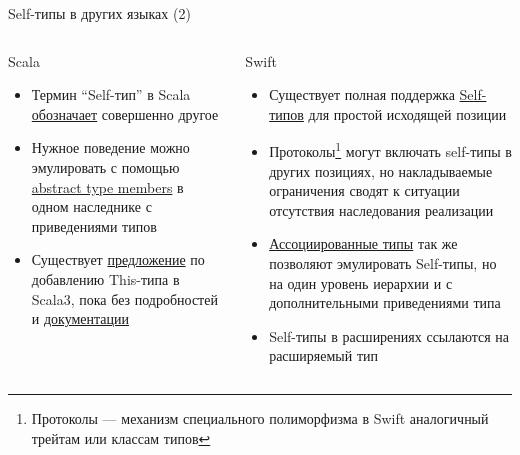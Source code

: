 \documentclass[handout,aspectratio=169,usenames,dvipsnames]{beamer}
\begin{document}
\begin{frame}[fragile]{Self-типы в других языках (2)}
    \begin{columns}[onlytextwidth]
        \begin{column}{0.44\textwidth}
            \begin{block}{Scala}
                \begin{itemize}
                    \item Термин ``Self-тип'' в Scala \href{https://docs.scala-lang.org/tour/self-types.html}{\color{blue} обозначает} совершенно другое
                    \item Нужное поведение можно эмулировать с помощью \href{https://docs.scala-lang.org/tour/abstract-type-members.html}{\color{blue}abstract type members} в одном наследнике с приведениями типов
                    \item Существует \href{https://github.com/lampepfl/dotty/issues/7374}{\color{blue}предложение} по добавлению This-типа в Scala3, пока без подробностей и \href{http://dotty.epfl.ch/}{\color{blue}документации}
                \end{itemize}
            \end{block}
        \end{column}\hfill%
        \pause
        \begin{column}{0.53\textwidth}
            \begin{block}{Swift}
                \begin{itemize}
                    \item Существует полная поддержка \href{https://docs.swift.org/swift-book/documentation/the-swift-programming-language/types/\#Self-Type}{\color{blue}Self-типов} для простой исходящей позиции
                    \item Протоколы\footnote{Протоколы --- механизм специального полиморфизма в Swift аналогичный трейтам или классам типов} могут включать self-типы в других позициях, но накладываемые ограничения сводят к ситуации отсутствия наследования реализации
                    \item \href{https://docs.swift.org/swift-book/documentation/the-swift-programming-language/generics/\#Associated-Types}{\color{blue}Ассоциированные типы} так же позволяют эмулировать Self-типы, но на один уровень иерархии и с дополнительными приведениями типа
                    \item Self-типы в расширениях ссылаются на расширяемый тип
                \end{itemize}
            \end{block}
        \end{column}
    \end{columns}
\end{frame}
\end{document}
